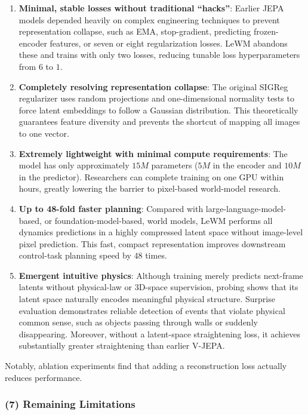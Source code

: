 \begin{enumerate}
\def\labelenumi{\arabic{enumi}.}
\tightlist
\item
  \textbf{Minimal, stable losses without traditional ``hacks''}: Earlier JEPA models depended heavily on complex engineering techniques to prevent representation collapse, such as EMA, stop-gradient, predicting frozen-encoder features, or seven or eight regularization losses. LeWM abandons these and trains with only two losses, reducing tunable loss hyperparameters from \(6\) to \(1\).
\item
  \textbf{Completely resolving representation collapse}: The original SIGReg regularizer uses random projections and one-dimensional normality tests to force latent embeddings to follow a Gaussian distribution. This theoretically guarantees feature diversity and prevents the shortcut of mapping all images to one vector.
\item
  \textbf{Extremely lightweight with minimal compute requirements}: The model has only approximately \(15M\) parameters (\(5M\) in the encoder and \(10M\) in the predictor). Researchers can complete training on one GPU within hours, greatly lowering the barrier to pixel-based world-model research.
\item
  \textbf{Up to 48-fold faster planning}: Compared with large-language-model-based, or foundation-model-based, world models, LeWM performs all dynamics predictions in a highly compressed latent space without image-level pixel prediction. This fast, compact representation improves downstream control-task planning speed by \(48\) times.
\item
  \textbf{Emergent intuitive physics}: Although training merely predicts next-frame latents without physical-law or 3D-space supervision, probing shows that its latent space naturally encodes meaningful physical structure. Surprise evaluation demonstrates reliable detection of events that violate physical common sense, such as objects passing through walls or suddenly disappearing.
  Moreover, without a latent-space straightening loss, it achieves substantially greater straightening than earlier V-JEPA.
\end{enumerate}

Notably, ablation experiments find that adding a reconstruction loss actually reduces performance.

\hypertarget{remaining-limitations}{%
\subsubsection{(7) Remaining Limitations}\label{remaining-limitations}}

